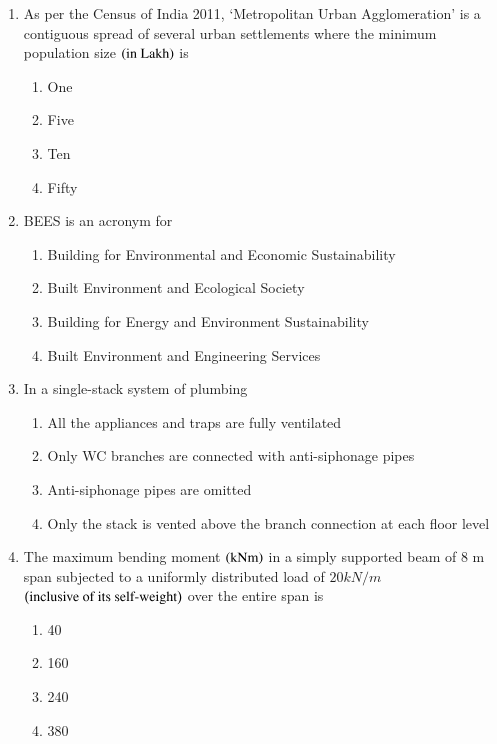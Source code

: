 \documentclass[journal,12pt,onecolumn]{IEEEtran}
\theoremstyle{remark}
\begin{document}
\begin{enumerate}
\item As per the Census of India 2011, ‘Metropolitan Urban Agglomeration’ is a contiguous spread of several urban settlements where the minimum population size $\brak{\text{in Lakh}}$ is

\hfill{}
\begin{enumerate}
\item One
\item Five
\item Ten
\item Fifty
\end{enumerate}

\item BEES is an acronym for

\hfill{}
\begin{enumerate}
\item Building for Environmental and Economic Sustainability
\item Built Environment and Ecological Society
\item Building for Energy and Environment Sustainability
\item Built Environment and Engineering Services
\end{enumerate}

\item In a single-stack system of plumbing

\hfill{}
\begin{enumerate}
\item All the appliances and traps are fully ventilated
\item Only WC branches are connected with anti-siphonage pipes
\item Anti-siphonage pipes are omitted
\item Only the stack is vented above the branch connection at each floor level
\end{enumerate}

\item The maximum bending moment $\brak{\text{kNm}}$ in a simply supported beam of 8 m span subjected to a uniformly distributed load of $20 kN/m$ $\brak{\text{inclusive of its self-weight}}$ over the entire span is

\hfill{}
\begin{enumerate}
\item 40
\item 160
\item 240
\item 380
\end{enumerate}


\end{enumerate}
\end{document}
